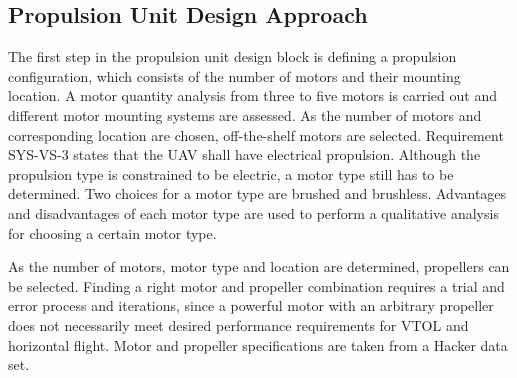 \subsection{Propulsion Unit Design Approach}
The first step in the propulsion unit design block is defining a propulsion configuration, which consists of the number of motors and their mounting location. A motor quantity analysis from three to five motors is carried out and different motor mounting systems are assessed. As the number of motors and corresponding location are chosen, off-the-shelf motors are selected. Requirement SYS-VS-3 states that the UAV shall have electrical propulsion. Although the propulsion type is constrained to be electric, a motor type still has to be determined. Two choices for a motor type are brushed and brushless. Advantages and disadvantages of each motor type are used to perform a qualitative analysis for choosing a certain motor type.



As the number of motors, motor type and location are determined, propellers can be selected. Finding a right motor and propeller combination requires a trial and error process and iterations, since a powerful motor with an arbitrary propeller does not necessarily meet desired performance requirements for VTOL and horizontal flight. Motor and propeller specifications are taken from a Hacker data set\cite{hackerdata}. \\




